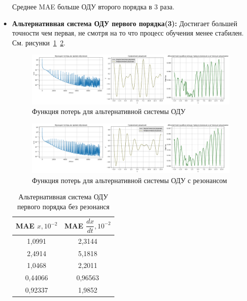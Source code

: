 \documentclass[12pt,a4paper]{article}
\begin{document}
\begin{itemize}
    Среднее MAE больше ОДУ второго порядка в 3 раза.

    \newpage
    \item \textbf{Альтернативная система ОДУ первого порядка(3):} Достигает большей точности чем первая, не смотря на то что процесс обучения менее стабилен. См. рисунки~\ref{fig:loss_alt}~\ref{fig:loss_alt_resonance}.
    
    \begin{figure}[h!]
        \centering
        \includegraphics[width=1\textwidth]{images/Loss&x_alt_ODE.png}
        \caption{Функция потерь для альтернативной системы ОДУ}
        \label{fig:loss_alt}
    \end{figure}

    \begin{figure}[h!]
        \centering
        \includegraphics[width=1\textwidth]{images/Loss&x_alt_ODE_resonance.png}
        \caption{Функция потерь для альтернативной системы ОДУ с резонансом}
        \label{fig:loss_alt_resonance}
    \end{figure}

    \begin{table}[h!]
        \centering
        \begin{tabular}{|c|c|}
        \hline
        \textbf{MAE $x, 10^{-2}$} & \textbf{MAE $\dfrac{dx}{dt}, 10^{-2}$} \\
        \hline
        1,0991 & 2,3144 \\
        2,4914 & 5,1818 \\
        1,0468 & 2,2011 \\
        0,44066 & 0,96563 \\
        0,92337 & 1,9852 \\
        \hline
        \end{tabular}
        \caption{Альтернативная система ОДУ первого порядка без резонанся}
    \end{table}
        
\end{itemize}
\end{document}
